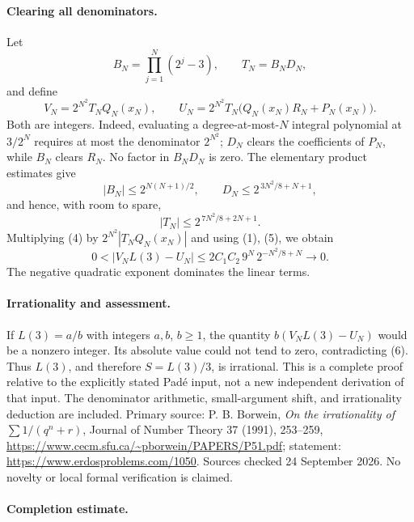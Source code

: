 \paragraph{Clearing all denominators.}
Let
\[
 B_N=\prod_{j=1}^{N}(2^j-3),\qquad T_N=B_ND_N,
\]
and define
\[
 V_N=2^{N^2}T_NQ_N(x_N),\qquad
 U_N=2^{N^2}T_N\bigl(Q_N(x_N)R_N+P_N(x_N)\bigr).
\]
Both are integers. Indeed, evaluating a degree-at-most-\(N\) integral polynomial at \(3/2^N\) requires at most the denominator \(2^{N^2}\); \(D_N\) clears the coefficients of \(P_N\), while \(B_N\) clears \(R_N\). No factor in \(B_ND_N\) is zero.
The elementary product estimates give
\[
 |B_N|\leq2^{N(N+1)/2},\qquad
 D_N\leq2^{\,3N^2/8+N+1},
\]
and hence, with room to spare,
\[
 |T_N|\leq2^{\,7N^2/8+2N+1}.
 \tag{5}
\]
Multiplying (4) by \(2^{N^2}|T_NQ_N(x_N)|\) and using (1), (5), we obtain
\[
 0<|V_NL(3)-U_N|
 \leq 2C_1C_2\,9^N\,2^{-N^2/8+N}
 \longrightarrow0.
 \tag{6}
\]
The negative quadratic exponent dominates the linear terms.

\paragraph{Irrationality and assessment.}
If \(L(3)=a/b\) with integers \(a,b\), \(b\geq1\), the quantity
\(b(V_NL(3)-U_N)\) would be a nonzero integer. Its absolute value could not tend to zero, contradicting (6). Thus \(L(3)\), and therefore \(S=L(3)/3\), is irrational.
This is a complete proof relative to the explicitly stated Pad\'e input, not a new independent derivation of that input. The denominator arithmetic, small-argument shift, and irrationality deduction are included. Primary source: P. B. Borwein, \emph{On the irrationality of \(\sum 1/(q^n+r)\)}, Journal of Number Theory 37 (1991), 253--259, \url{https://www.cecm.sfu.ca/~pborwein/PAPERS/P51.pdf}; statement: \url{https://www.erdosproblems.com/1050}. Sources checked 24 September 2026. No novelty or local formal verification is claimed.

\paragraph{Completion estimate.}
